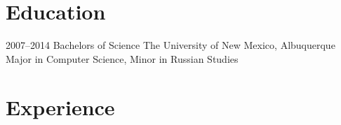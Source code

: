 \documentclass[]{friggeri-cv} %
\begin{document}
\section{Education}

\begin{entrylist}
\entry
{2007--2014}
{Bachelors {\normalfont of Science}}
{The University of New Mexico, Albuquerque}
{Major in Computer Science, Minor in Russian Studies}
\end{entrylist}


\section{Experience}
\end{document}
